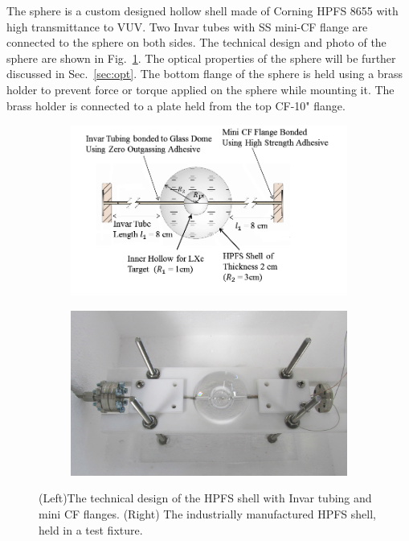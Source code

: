The sphere is a custom designed hollow shell made of Corning HPFS 8655 with high transmittance to VUV. Two Invar tubes with SS mini-CF flange are connected to the sphere on both sides. The technical design and photo of the sphere are shown in Fig.~\ref{fig:sphere}. The optical properties of the sphere will be further discussed in Sec.~\ref{sec:opt}. 
The bottom flange of the sphere is held using a brass holder to prevent 
force or torque applied on the sphere while mounting it. The 
brass holder is connected to a plate held from the top CF-10" flange. 


\begin{figure}[h]
\centering
\begin{subfigure}[c]{0.4\textheight}
\includegraphics[width=\textwidth]{spheredesign1.png}
\end{subfigure}
\begin{subfigure}[c]{0.25\textheight}
\includegraphics[width=\textwidth]{spherephoto.png}
\end{subfigure}
\caption{(Left)The technical design of the HPFS shell with Invar tubing and mini CF flanges. 
(Right) The industrially manufactured HPFS shell, held in a test fixture.} 
\label{fig:sphere}
\end{figure}



